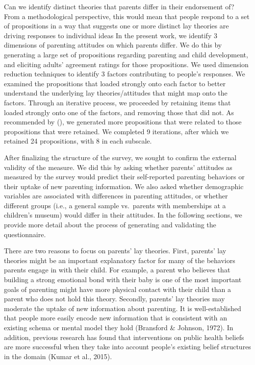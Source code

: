 \documentclass[floatsintext,man]{apa6}
\theoremstyle{definition}
\theoremstyle{definition}
\theoremstyle{definition}
\theoremstyle{remark}
\begin{document}
Can we identify distinct theories that parents differ in their
endorsement of? From a methodological perspective, this would mean that
people respond to a set of propositions in a way that suggests one or
more distinct lay theories are driving responses to individual ideas In
the present work, we identify 3 dimensions of parenting attitudes on
which parents differ. We do this by generating a large set of
propositions regarding parenting and child development, and eliciting
adults' agreement ratings for those propositions. We used dimension
reduction techniques to identify 3 factors contributing to people's
responses. We examined the propositions that loaded strongly onto each
factor to better understand the underlying lay theories/attitudes that
might map onto the factors. Through an iterative process, we proceeded
by retaining items that loaded strongly onto one of the factors, and
removing those that did not. As recommended by (), we generated more
propositions that were related to those propositions that were retained.
We completed 9 iterations, after which we retained 24 propositions, with
8 in each subscale.

After finalizing the structure of the survey, we sought to confirm the
external validity of the measure. We did this by asking whether parents'
attitudes as measured by the survey would predict their self-reported
parenting behaviors or their uptake of new parenting information. We
also asked whether demographic variables are associated with differences
in parenting attitudes, or whether different groups (i.e., a general
sample vs.~parents with memberships at a children's museum) would differ
in their attitudes. In the following sections, we provide more detail
about the process of generating and validating the questionnaire.

There are two reasons to focus on parents' lay theories. First, parents'
lay theories might be an important explanatory factor for many of the
behaviors parents engage in with their child. For example, a parent who
believes that building a strong emotional bond with their baby is one of
the most important goals of parenting might have more physical contact
with their child than a parent who does not hold this theory. Secondly,
parents' lay theories may moderate the uptake of new information about
parenting. It is well-established that people more easily encode new
information that is consistent with an existing schema or mental model
they hold (Bransford \& Johnson, 1972). In addition, previous research
has found that interventions on public health beliefs are more
successful when they take into account people's existing belief
structures in the domain (Kumar et al., 2015).
\end{document}
